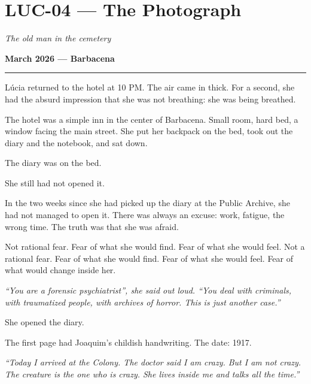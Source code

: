 \section*{\textbf{LUC-04} --- The Photograph}

\noindent \textit{The old man in the cemetery}

\noindent \textbf{March 2026 --- Barbacena}

\vspace{0.5em}\noindent\rule{\textwidth}{0.5pt}\vspace{0.5em}

\noindent Lúcia returned to the hotel at 10 PM.
\noindent The air came in thick. For a second, she had the absurd impression that she was not breathing: she was being breathed.

\noindent The hotel was a simple inn in the center of Barbacena. Small room, hard bed, a window facing the main street. She put her backpack on the bed, took out the diary and the notebook, and sat down.

\noindent The diary was on the bed.

\noindent She still had not opened it.

\noindent In the two weeks since she had picked up the diary at the Public Archive, she had not managed to open it. There was always an excuse: work, fatigue, the wrong time. The truth was that she was afraid.

\noindent Not rational fear.
Fear of what she would find.
Fear of what she would feel.
\noindent Not a rational fear. Fear of what she would find. Fear of what she would feel. Fear of what would change inside her.

\noindent \textit{\textquotedblleft{}You are a forensic psychiatrist\textquotedblright{}\textit{, she said out loud. }\textquotedblleft{}You deal with criminals, with traumatized people, with archives of horror. This is just another case.\textquotedblright{}}

\noindent She opened the diary.

\noindent The first page had Joaquim's childish handwriting. The date: 1917.

\noindent \textit{\textquotedblleft{}Today I arrived at the Colony. The doctor said I am crazy. But I am not crazy. The creature is the one who is crazy. She lives inside me and talks all the time.\textquotedblright{}}

